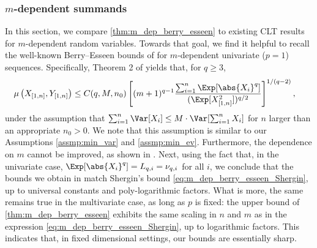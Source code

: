 \documentclass[aos]{imsart}
\begin{document}
\subsubsection{\texorpdfstring{$m$}{m}-dependent summands} \label{sec:comparison_m_dep}
In this section, we compare \cref{thm:m_dep_berry_esseen} to existing CLT results for $m$-dependent random variables. %
Towards that goal, we find it helpful to recall the well-known Berry--Esseen bounds of \citet{shergin1980convergence} for $m$-dependent univariate ($p=1$) sequences. Specifically, Theorem 2 of \citet{shergin1980convergence} yields that, for $q \geq 3$,
\begin{equation} \label{eq:m_dep_berry_esseen_Shergin}
\begin{aligned}
    \mu\left( X_{[1,n]}, Y_{[1,n]} \right)
    & \leq C(q,M,n_0) \left[ (m+1)^{q-1} \frac{\sum_{i=1}^n \Exp[\abs{X_i}^q]}{(\Exp[X_{[1,n]}^2])^{q/2}} \right]^{1/(q-2)},
\end{aligned}
\end{equation}
under the assumption that $\sum_{i=1}^n \Var[X_i] \leq M \cdot \Var[\sum_{i=1}^n X_i]$ for $n$ larger than an appropriate $n_0 > 0$. %
We note that this assumption is similar to our Assumptions \eqref{assmp:min_var} and \eqref{assmp:min_ev}. %
Furthermore, the dependence on $m$ cannot be improved, as shown in \citet{berk1973central}. Next, using the fact that, in the univariate case, $\Exp[\abs{X_i}^q] = L_{q,i} = \nu_{q,i}$ for all $i$, we conclude that the bounds we obtain in  match Shergin's bound \eqref{eq:m_dep_berry_esseen_Shergin}, up to universal constants and poly-logarithmic factors. What is more, the same remains true in the multivariate case, as long as $p$ is fixed: the upper bound of \cref{thm:m_dep_berry_esseen} exhibits the same scaling in $n$ and $m$ as in the expression \eqref{eq:m_dep_berry_esseen_Shergin}, up to logarithmic factors. This indicates that, in fixed dimensional settings, our bounds are essentially sharp.
\end{document}
